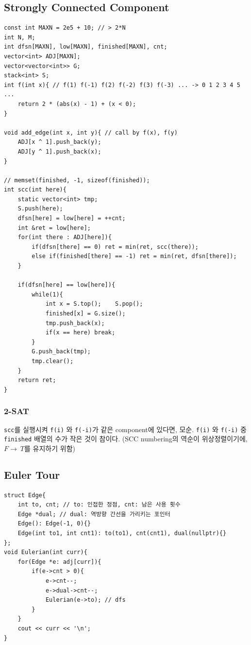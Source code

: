 \documentclass[landscape, 8pt, a4paper, oneside, twocolumn]{extarticle}
\begin{document}
\subsection{Strongly Connected Component}
\begin{verbatim}
const int MAXN = 2e5 + 10; // > 2*N
int N, M;
int dfsn[MAXN], low[MAXN], finished[MAXN], cnt;
vector<int> ADJ[MAXN];
vector<vector<int>> G;
stack<int> S;
int f(int x){ // f(1) f(-1) f(2) f(-2) f(3) f(-3) ... -> 0 1 2 3 4 5 ...
    return 2 * (abs(x) - 1) + (x < 0);
}

void add_edge(int x, int y){ // call by f(x), f(y)
    ADJ[x ^ 1].push_back(y);
    ADJ[y ^ 1].push_back(x);
}

// memset(finished, -1, sizeof(finished));
int scc(int here){
    static vector<int> tmp;
    S.push(here);
    dfsn[here] = low[here] = ++cnt;
    int &ret = low[here];
    for(int there : ADJ[here]){
        if(dfsn[there] == 0) ret = min(ret, scc(there));
        else if(finished[there] == -1) ret = min(ret, dfsn[there]);
    }

    if(dfsn[here] == low[here]){
        while(1){
            int x = S.top();    S.pop();
            finished[x] = G.size();
            tmp.push_back(x);
            if(x == here) break;
        }
        G.push_back(tmp);
        tmp.clear();
    }
    return ret;
}
\end{verbatim}
\subsubsection{2-SAT}
\texttt{scc}를 실행시켜 \texttt{f(i)} 와 \texttt{f(-i)}가 같은 component에 있다면, 모순. \texttt{f(i)} 와 \texttt{f(-i)} 중 \texttt{finished} 배열의 수가 작은 것이 참이다. (SCC numbering의 역순이 위상정렬이기에, $ F \to\ T$를 유지하기 위함)

\subsection{Euler Tour}
\begin{verbatim}
struct Edge{
    int to, cnt; // to: 인접한 정점, cnt: 남은 사용 횟수
    Edge *dual; // dual: 역방향 간선을 가리키는 포인터
    Edge(): Edge(-1, 0){}
    Edge(int to1, int cnt1): to(to1), cnt(cnt1), dual(nullptr){}
};
void Eulerian(int curr){
    for(Edge *e: adj[curr]){
        if(e->cnt > 0){
            e->cnt--;
            e->dual->cnt--;
            Eulerian(e->to); // dfs
        }
    }
    cout << curr << '\n';
}
\end{verbatim}
\end{document}
